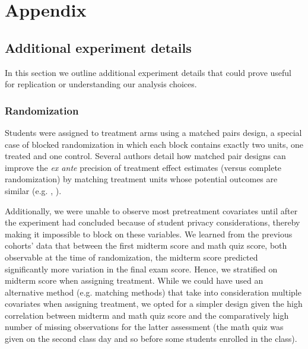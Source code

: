 \documentclass[12pt]{article}
\begin{document}

\clearpage

\section*{Appendix}

\renewcommand{\thesubsection}{\Alph{subsection}}

\setcounter{table}{0}
\renewcommand{\thetable}{A\arabic{table}}
\setcounter{figure}{0}
\renewcommand{\thefigure}{A\arabic{figure}}

\subsection{Additional experiment details}

In this section we outline additional experiment details that could prove useful for replication or understanding our analysis choices.

\subsubsection{Randomization} \label{a_randomization}
Students were assigned to treatment arms using a matched pairs design, a special case of blocked randomization in which each block contains exactly two units, one treated and one control. Several authors detail how matched pair designs can improve the \textit{ex ante} precision of treatment effect estimates (versus complete randomization) by matching treatment units whose potential outcomes are similar (e.g. \cite{ir2015}, \cite{ai2017}).

Additionally, we were unable to observe most pretreatment covariates until after the experiment had concluded because of student privacy considerations, thereby making it impossible to block on these variables. We learned from the previous cohorts' data that between the first midterm score and math quiz score, both observable at the time of randomization, the midterm score predicted significantly more variation in the final exam score. Hence, we stratified on midterm score when assigning treatment. While we could have used an alternative method (e.g. matching methods) that take into consideration multiple covariates when assigning treatment, we opted for a simpler design given the high correlation between midterm and math quiz score and the comparatively high number of missing observations for the latter assessment (the math quiz was given on the second class day and so before some students enrolled in the class).
\end{document}

